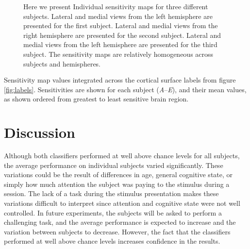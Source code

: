 \documentclass[review,1p,authoryear]{elsarticle}
\begin{document}
\begin{figure}[p]
\begin{subfigure}{0.3\textwidth}
\caption{}
\label{fig:s3-lh-medial-sensitivity}
\end{subfigure}
\caption{Here we present Individual sensitivity maps for three different subjects. 
Lateral  and medial  views from the left hemisphere are presented for the first subject.
Lateral  and medial  views from the right hemisphere are presented for the second subject.
Lateral  and medial  views from the left hemisphere are presented for the third subject.
The sensitivity maps are relatively homogeneous across subjects and hemispheres.}
\label{fig:individual-sensitivity}
\end{figure}

\begin{table}[p]
\centering

\caption{Sensitivity map values integrated across the cortical surface labels from figure \ref{fig:labels}. Sensitivities are shown for each subject (\emph{A}--\emph{E}), and their mean values, as shown ordered from greatest to least sensitive brain region.}
\label{tab:full-sensitivity}
\end{table}

\section{Discussion}
Although both classifiers performed at well above chance levels for all subjects, the average performance on individual subjects varied significantly.
These variations could be the result of differences in age, general cognitive state, or simply how much attention the subject was paying to the stimulus during a session.
The lack of a task during the stimulus presentation makes these variations difficult to interpret since attention and cognitive state were not well controlled.
In future experiments, the subjects will be asked to perform a challenging task, and the average performance is expected to increase and the variation between subjects to decrease.
However, the fact that the classifiers performed at well above chance levels increases confidence in the results.
\end{document}
